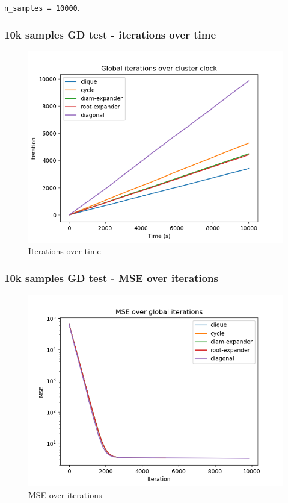 \documentclass[11pt]{article}
\makeatletter
\def\maxwidth{\ifdim\Gin@nat@width>\linewidth\linewidth
    \else\Gin@nat@width\fi}
\let\Oldincludegraphics\includegraphics
\renewcommand{\includegraphics}[1]{\Oldincludegraphics[width=.8\maxwidth]{#1}}
\makeatother
\begin{document}
\texttt{n\_samples\ =\ 10000}.

    \subsubsection{10k samples GD test - iterations over
time}\label{k-samples-gd-test---iterations-over-time}

\begin{figure}
\centering
\includegraphics{media/img/tests/test_003_10ksamples_classic/1_iter_time.png}
\caption{Iterations over time}
\end{figure}

    \subsubsection{10k samples GD test - MSE over
iterations}\label{k-samples-gd-test---mse-over-iterations}

\begin{figure}
\centering
\includegraphics{media/img/tests/test_003_10ksamples_classic/2_mse_iter.png}
\caption{MSE over iterations}
\end{figure}
\end{document}
